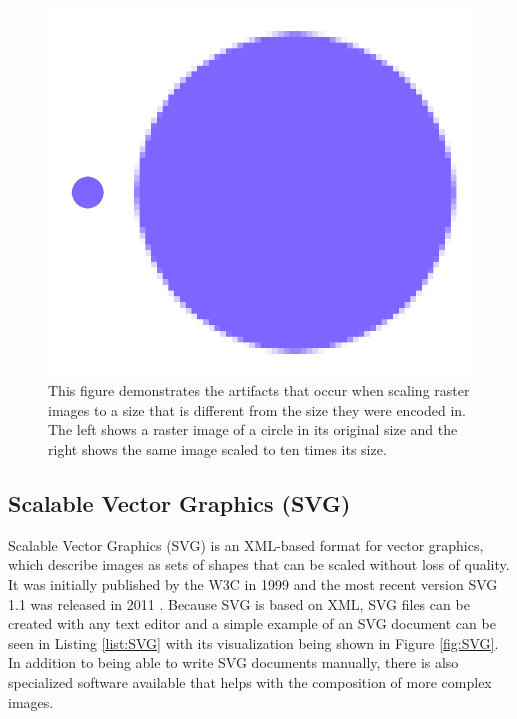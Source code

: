 \begin{figure}[tp]
    \centering
    \includegraphics[keepaspectratio,width=\linewidth,height=\fullh / 3]
    {images/raster-image.png}

    \caption[Raster Image Scaling Artifacts]{
        This figure demonstrates the artifacts that occur when scaling raster images to a size that is different from the size they were encoded in. The left shows a raster image of a circle in its original size and the right shows the same image scaled to ten times its size.
          
    }
    \label{fig:RasterImage}
\end{figure}

\subsection{Scalable Vector Graphics (SVG)}

Scalable Vector Graphics (SVG) is an XML-based format for vector graphics, which describe images as sets of shapes that can be scaled without loss of quality. It was initially published by the W3C in 1999 \parencite{SVG1.0} and the most recent version SVG 1.1 was released in 2011 \parencite{SVG1.1}. Because SVG is based on XML, SVG files can be created with any text editor and a simple example of an SVG document can be seen in Listing \ref{list:SVG} with its visualization being shown in Figure \ref{fig:SVG}. In addition to being able to write SVG documents manually, there is also specialized software available that helps with the composition of more complex images.

